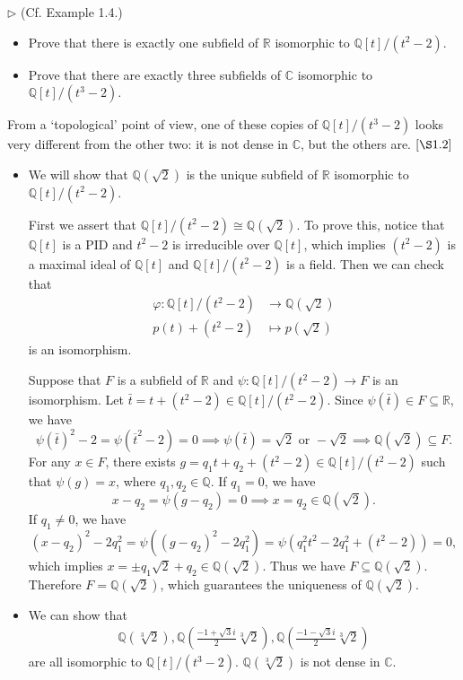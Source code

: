 \documentclass[12pt,letterpaper,boxed]{hmcpset}
\begin{document}
\begin{problem}[1.5]
$\triangleright$ (Cf. Example 1.4.)
	\begin{itemize}
	\item Prove that there is exactly one subfield of $\mathbb{R}$ isomorphic to $\mathbb{Q}[t] /\left(t^{2}-2\right)$.
	\item  Prove that there are exactly three subfields of $\mathbb{C}$ isomorphic to $\mathbb{Q}[t] /\left(t^{3}-2\right)$.
	\end{itemize}
From a `topological' point of view, one of these copies of $\mathbb{Q}[t] /\left(t^{3}-2\right)$ looks very different from the other two: it is not dense in $\mathbb{C}$, but the others are. $[\S 1.2]$
\end{problem}
\begin{solution}
	\begin{itemize}
		\item We will show that $\mathbb{Q}(\sqrt{2})$ is the unique subfield of $\mathbb{R}$ isomorphic to $\mathbb{Q}[t] /\left(t^{2}-2\right)$. 
  
		First we assert that $\mathbb{Q}[t] /\left(t^{2}-2\right)\cong\mathbb{Q}(\sqrt{2})$. To prove this, notice that $\mathbb{Q}[t]$ is a PID and $t^2-2$ is irreducible over $\mathbb{Q}[t]$, which implies $\left(t^{2}-2\right)$ is a maximal ideal of $\mathbb{Q}[t]$ and $\mathbb{Q}[t] /\left(t^{2}-2\right)$ is a field. Then we can check that
		\begin{align*}
			\varphi:\mathbb{Q}[t] /\left(t^{2}-2\right)&\longrightarrow \mathbb{Q}(\sqrt{2}) \\
			p(t)+(t^2-2)&\longmapsto p(\sqrt{2})
		\end{align*}
		is an isomorphism.

		Suppose that $F$ is a subfield of $\mathbb{R}$ and $\psi:\mathbb{Q}[t] /\left(t^{2}-2\right)\to F$ is an isomorphism. Let $\bar{t}=t+(t^2-2)\in \mathbb{Q}[t] /\left(t^{2}-2\right)$. Since $\psi(\bar{t})\in F\subseteq\mathbb{R}$, we have
		\[
			\psi\left(\bar{t}\right)^2-2=\psi\left(\overline{t}^2-2\right)=0\implies \psi(\bar{t})=\sqrt{2}\text{ or }-\sqrt{2}\implies \mathbb{Q}(\sqrt{2})\subseteq F.
		\]
		For any $x\in F$, there exists $g=q_1t+q_2+\left(t^{2}-2\right)\in\mathbb{Q}[t] /\left(t^{2}-2\right)$ such that $\psi(g)=x$, where $q_1,q_2\in\mathbb{Q}$. If $q_1=0$, we have
		\[
			x-q_2=\psi(g-q_2)=0\implies x=q_2\in \mathbb{Q}(\sqrt{2}).
		\]
		If $q_1\ne0$, we have
		\[
			(x-q_2)^2-2q_1^2=\psi((g-q_2)^2-2q_1^2)=\psi(q_1^2t^2-2q_1^2+(t^2-2))=0,
		\]
		which implies $x=\pm q_1\sqrt{2}+q_2\in \mathbb{Q}(\sqrt{2})$. Thus we have $F\subseteq\mathbb{Q}(\sqrt{2})$. Therefore $F=\mathbb{Q}(\sqrt{2})$, which guarantees the uniqueness of $\mathbb{Q}(\sqrt{2})$.
		\item  We can show that 
		\begin{align*}
			\mathbb{Q}(\sqrt[3]{2}),\mathbb{Q}\left(\frac{-1+\sqrt{3}i}{2}\sqrt[3]{2}\right),\mathbb{Q}\left(\frac{-1-\sqrt{3}i}{2}\sqrt[3]{2}\right)
		\end{align*}
		are all isomorphic to $\mathbb{Q}[t] /\left(t^{3}-2\right)$. $\mathbb{Q}(\sqrt[3]{2})$ is not dense in $\mathbb{C}$.
	\end{itemize}
\end{solution}
\end{document}
